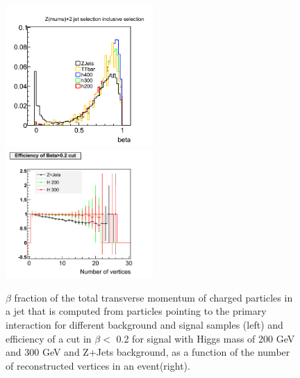 \begin{figure}[htb]
\begin{center}
\centerline{
\includegraphics[width=0.50\textwidth]{Selection/beta_Zmm.png}
\includegraphics[width=0.50\textwidth]{Selection/beta_eff.png}
}
\caption{
$\beta$ fraction of the total transverse momentum of charged particles in a jet that is computed from particles pointing to the primary interaction for different background and signal samples (left) and efficiency of a cut in $\beta <$ 0.2 for signal with Higgs mass of 200 GeV and 300 GeV and Z+Jets background, as a function of the number of reconstructed vertices in an event(right).~\cite{2l2q115}
}
\label{fig:beta}
\end{center}
\end{figure}


